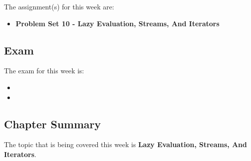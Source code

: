 The assignment(s) for this week are:

\begin{itemize}
    \item \textbf{Problem Set 10 - Lazy Evaluation, Streams, And Iterators}
\end{itemize}

\subsection{Exam}

The exam for this week is:

\begin{itemize}
    \item {}
    \item {}
\end{itemize}

\subsection{Chapter Summary}

The topic that is being covered this week is \textbf{Lazy Evaluation, Streams, And Iterators}.

